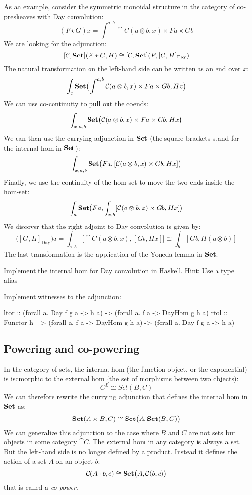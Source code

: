 \documentclass[DaoFP]{subfiles}
\begin{document}
As an example, consider the symmetric monoidal structure in the category of co-presheaves with Day convolution:
\[ (F \star G) x = \int^{a, b} \cat C (a \otimes b, x) \times F a \times G b \]
We are looking for the adjunction:
\[ [\mathcal{C}, \mathbf{Set}] (F \star G, H) \cong  [\mathcal{C}, \mathbf{Set}] (F, [G, H]_{\text{Day}}) \]
The natural transformation on the left-hand side can be written as an end over $x$:
\[ \int_x \mathbf{Set} \big( \int^{a, b} \mathcal{C} (a \otimes b, x) \times F a \times G b, H x \big) \]
We can use co-continuity to pull out the coends:
\[ \int_{x, a, b} \mathbf{Set} \big( \mathcal{C} (a \otimes b, x) \times F a \times G b, H x \big) \]
We can then use the currying adjunction in $\mathbf{Set}$ (the square brackets stand for the internal hom in $\mathbf{Set}$):
\[ \int_{x, a, b} \mathbf{Set} \big( F a, [\mathcal{C} (a \otimes b, x)  \times G b, H x] \big) \]
Finally, we use the continuity of the hom-set to move the two ends inside the hom-set:
\[ \int_{a} \mathbf{Set} \big( F a, \int_{x, b} [\mathcal{C} (a \otimes b, x)  \times G b, H x] \big) \]
We discover that the right adjoint to Day convolution is given by:
\[ \big([G, H]_{\text{Day}}\big) a = \int_{x, b} \big[\cat C(a \otimes b, x), [G b, H x]\big] \cong \int_b [G b, H (a \otimes b)]\]
The last transformation is the application of the Yoneda lemma in $\mathbf{Set}$.
\begin{exercise}
Implement the internal hom for Day convolution in Haskell. Hint: Use a type alias.
\end{exercise}
\begin{exercise}
Implement witnesses to the adjunction:
\begin{haskell}
ltor :: (forall a. Day f g a -> h a) -> (forall a. f a -> DayHom g h a)
rtol :: Functor h => 
  (forall a. f a -> DayHom g h a) -> (forall a. Day f g a -> h a)
\end{haskell}
\end{exercise}

\subsection{Powering and co-powering}

In the category of sets, the internal hom (the function object, or the exponential) is isomorphic to the external hom (the set of morphisms between two objects):
\[ C^B \cong Set(B, C) \]
We can therefore rewrite the currying adjunction that defines the internal hom in $\mathbf{Set}$ as:
\[ \mathbf{Set} (A \times B, C)  \cong \mathbf{Set} \big(A, \mathbf{Set} (B, C)\big) \]
We can generalize this adjunction to the case where $B$ and $C$ are not sets but objects in some category $\cat C$. The external hom in any category is always a set. But the left-hand side is no longer defined by a product. Instead it defines the action of a set $A$ on an object $b$:
\[ \mathcal{C} (A \cdot b, c) \cong \mathbf{Set} \big( A, \mathcal{C} (b, c)\big) \]
that is called a \emph{co-power}.
\end{document}
